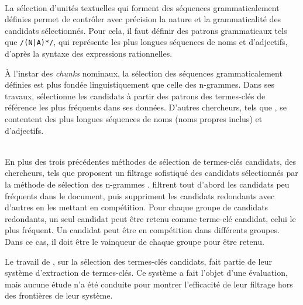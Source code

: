     \begin{example}
    \end{example}

    ~\\La sélection d'unités textuelles qui forment des séquences
    grammaticalement définies permet de contrôler
    avec précision la nature et la grammaticalité des candidats sélectionnés.
    Pour cela, il faut définir des patrons grammaticaux tels que \texttt{/(N|A)*/}, qui représente les plus longues séquences de noms et
    d'adjectifs, d'après la syntaxe des expressions rationnelles.

    À l'instar des \textit{chunks} nominaux, la sélection des séquences
    grammaticalement définies est plus fondée linguistiquement que celle des
    n-grammes. Dans ses travaux, 
    sélectionne les candidats à partir des patrons des termes-clés de référence
    les plus fréquents dans ses données. D'autres chercheurs,
    tels que , se contentent des plus longues
    séquences de noms (noms propres inclus) et d'adjectifs.

    \begin{example}
    \end{example}

    ~\\En plus des trois précédentes méthodes de sélection de termes-clés
    candidats, des chercheurs, tels que
     proposent un filtrage
    sofistiqué des candidats sélectionnés par la méthode de sélection des
    n-grammes .  filtrent tout
    d'abord les candidats peu fréquents dans le document, puis suppriment les
    candidats redondants avec d'autres en les mettant en compétition. Pour
    chaque groupe de candidats redondants, un seul candidat peut être retenu
    comme terme-clé candidat, celui le plus fréquent. Un candidat peut être en
    compétition dans différents groupes. Dans ce cas, il doit être le
    \og{}vainqueur\fg{} de chaque groupe pour être retenu.

    Le travail de , sur la
    sélection des termes-clés candidats, fait partie de leur système
    d'extraction de termes-clés. Ce système a fait l'objet d'une évaluation,
    mais aucune étude n'a été conduite pour montrer l'efficacité de leur
    filtrage hors des frontières de leur système.

